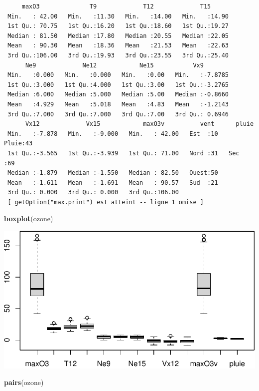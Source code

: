 \documentclass[
]{article}
\newenvironment{Shaded}{\begin{snugshade}}{\end{snugshade}}
\newcommand{\FunctionTok}[1]{\textcolor[rgb]{0.13,0.29,0.53}{\textbf{#1}}}
\newcommand{\NormalTok}[1]{#1}
\begin{document}
\begin{verbatim}
     maxO3              T9             T12             T15       
 Min.   : 42.00   Min.   :11.30   Min.   :14.00   Min.   :14.90  
 1st Qu.: 70.75   1st Qu.:16.20   1st Qu.:18.60   1st Qu.:19.27  
 Median : 81.50   Median :17.80   Median :20.55   Median :22.05  
 Mean   : 90.30   Mean   :18.36   Mean   :21.53   Mean   :22.63  
 3rd Qu.:106.00   3rd Qu.:19.93   3rd Qu.:23.55   3rd Qu.:25.40  
      Ne9             Ne12            Ne15           Vx9         
 Min.   :0.000   Min.   :0.000   Min.   :0.00   Min.   :-7.8785  
 1st Qu.:3.000   1st Qu.:4.000   1st Qu.:3.00   1st Qu.:-3.2765  
 Median :6.000   Median :5.000   Median :5.00   Median :-0.8660  
 Mean   :4.929   Mean   :5.018   Mean   :4.83   Mean   :-1.2143  
 3rd Qu.:7.000   3rd Qu.:7.000   3rd Qu.:7.00   3rd Qu.: 0.6946  
      Vx12             Vx15            maxO3v          vent      pluie   
 Min.   :-7.878   Min.   :-9.000   Min.   : 42.00   Est  :10   Pluie:43  
 1st Qu.:-3.565   1st Qu.:-3.939   1st Qu.: 71.00   Nord :31   Sec  :69  
 Median :-1.879   Median :-1.550   Median : 82.50   Ouest:50             
 Mean   :-1.611   Mean   :-1.691   Mean   : 90.57   Sud  :21             
 3rd Qu.: 0.000   3rd Qu.: 0.000   3rd Qu.:106.00                        
 [ getOption("max.print") est atteint -- ligne 1 omise ]
\end{verbatim}

\begin{Shaded}
\begin{Highlighting}[]
\FunctionTok{boxplot}\NormalTok{(ozone)}
\end{Highlighting}
\end{Shaded}

\includegraphics{TP-ML-Regression_files/figure-latex/unnamed-chunk-4-1.pdf}

\begin{Shaded}
\begin{Highlighting}[]
\FunctionTok{pairs}\NormalTok{(ozone)}
\end{Highlighting}
\end{Shaded}
\end{document}
